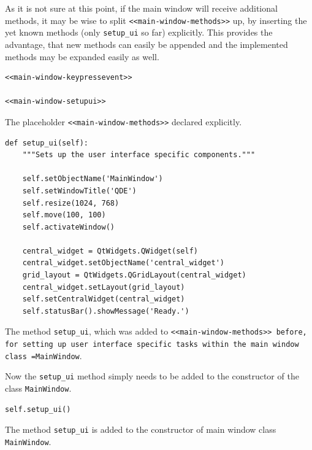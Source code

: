 \documentclass[10pt, openright, notitlepage]{scrreprt}
\begin{document}
As it is not sure at this point, if the main window will receive additional
methods, it may be wise to split \texttt{<<main-window-methods>>} up, by inserting the
yet known methods (only \texttt{setup\_ui} so far) explicitly. This provides the
advantage, that new methods can easily be appended and the implemented methods
may be expanded easily as well.

\begin{listing}[H]
\begin{verbatim}
<<main-window-keypressevent>>

<<main-window-setupui>>
\end{verbatim}
\caption{\label{main-window-methods}
The placeholder \texttt{<<main-window-methods>>} declared explicitly.}
\end{listing}

\begin{listing}[H]
\begin{verbatim}
def setup_ui(self):
    """Sets up the user interface specific components."""

    self.setObjectName('MainWindow')
    self.setWindowTitle('QDE')
    self.resize(1024, 768)
    self.move(100, 100)
    self.activateWindow()

    central_widget = QtWidgets.QWidget(self)
    central_widget.setObjectName('central_widget')
    grid_layout = QtWidgets.QGridLayout(central_widget)
    central_widget.setLayout(grid_layout)
    self.setCentralWidget(central_widget)
    self.statusBar().showMessage('Ready.')
\end{verbatim}
\caption{\label{main-window-setupui}
The method \texttt{setup\_ui}, which was added to \texttt{<<main-window-methods>> before, for setting up user interface specific tasks within the main window class =MainWindow}.}
\end{listing}

Now the \texttt{setup\_ui} method simply needs to be added to the constructor of the
class \texttt{MainWindow}.

\begin{listing}[H]
\begin{verbatim}
self.setup_ui()
\end{verbatim}
\caption{\label{main-window-constructor}
The method \texttt{setup\_ui} is added to the constructor of main window class \texttt{MainWindow}.}
\end{listing}
\end{document}
